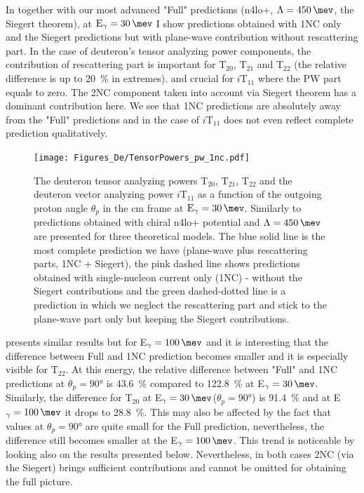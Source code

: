     In  together with our most advanced "Full" predictions 
    (\gls{n4lo+}, $\Lambda=\SI{450}{\mev}$, the Siegert theorem),
    at $\text{E}_\gamma = \SI{30}{\mev}$ 
    I show predictions obtained with 1NC only and 
    the Siegert predictions but with plane-wave contribution without rescattering part.
    In the case of deuteron's tensor analyzing power components, the contribution of rescattering part is  
    important for T$_{20}$, T$_{21}$ and T$_{22}$ (the relative difference is up to \SI{20}{\percent} 
    in extremes).
    and crucial for
    $i\text{T}_{11}$ where the PW part equals to zero.
    The 2NC component taken into account via Siegert theorem has a dominant contribution here. We see that 
    1NC predictions are absolutely away from the "Full" predictions and in the case of $i\text{T}_{11}$
    does not even reflect complete prediction qualitatively.

    \begin{figure}[h]
        \begin{center}
        \texttt{[image: Figures\_De/TensorPowers\_pw\_1nc.pdf]}
        \end{center}
        \caption{The deuteron tensor analyzing powers T$_{20}$, T$_{21}$, T$_{22}$ and 
        the deuteron vector analyzing power $i\text{T}_{11}$ as a function of the
        outgoing proton angle $\theta_p$ in the \gls{cm} frame at $\text{E}_\gamma = \SI{30}{\mev}$.
        Similarly to  predictions obtained with chiral \gls{n4lo+} potential
        and $\Lambda=\SI{450}{\mev}$ are presented for three theoretical models.
        The blue solid line is the most complete prediction we have (plane-wave plus rescattering parts, 1NC + Siegert), the pink dashed line shows predictions obtained with
        single-nucleon current only (1NC) - without the Siegert contributions and the green dashed-dotted line
        is a prediction in which we neglect the rescattering part
        and stick to the plane-wave part only but keeping the Siegert contributions.}
        \label{tensor_pw_1nc}
    \end{figure}

     presents similar results but for E$_\gamma = \SI{100}{\mev}$
    and it is interesting that the difference between Full and 1NC prediction becomes smaller
    and it is especially visible for $\text{T}_{22}$. At this energy, the relative difference 
    between "Full" and 1NC predictions
    at $\theta_p = \ang{90}$ is \SI{43.6}{\percent} compared to \SI{122.8}{\percent}
    at E$_\gamma = \SI{30}{\mev}$. Similarly, the difference for T$_{20}$
    at E$_\gamma = \SI{30}{\mev}$($\theta_p = \ang{90}$) is \SI{91.4}{\percent}
    and at E$_\gamma = \SI{100}{\mev}$ it drops to \SI{28.8}{\percent}.
    This may also be affected by the fact that values at $\theta_p = \ang{90}$ 
    are quite small for the Full prediction, nevertheless, the difference still becomes smaller at the
    E$_\gamma = \SI{100}{\mev}$.
    This trend is noticeable by looking also on the results presented below.
    Nevertheless, in both cases 2NC (via the Siegert) brings sufficient contributions
    and cannot be omitted for obtaining the full picture.

